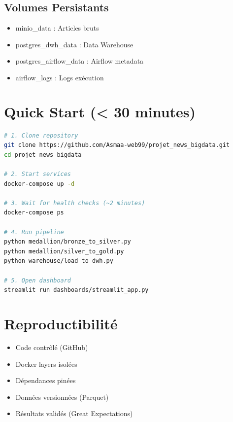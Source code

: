 \documentclass[12pt,a4paper]{report}
\begin{document}
\subsection{Volumes Persistants}

\begin{itemize}
    \item minio\_data : Articles bruts
    \item postgres\_dwh\_data : Data Warehouse
    \item postgres\_airflow\_data : Airflow metadata
    \item airflow\_logs : Logs exécution
\end{itemize}

\section{Quick Start (< 30 minutes)}

\begin{lstlisting}[language=bash, caption={Démarrage rapide}]
# 1. Clone repository
git clone https://github.com/Asmaa-web99/projet_news_bigdata.git
cd projet_news_bigdata

# 2. Start services
docker-compose up -d

# 3. Wait for health checks (~2 minutes)
docker-compose ps

# 4. Run pipeline
python medallion/bronze_to_silver.py
python medallion/silver_to_gold.py
python warehouse/load_to_dwh.py

# 5. Open dashboard
streamlit run dashboards/streamlit_app.py
\end{lstlisting}

\section{Reproductibilité}

\begin{itemize}
    \item[✓] Code contrôlé (GitHub)
    \item[✓] Docker layers isolées
    \item[✓] Dépendances pinées
    \item[✓] Données versionnées (Parquet)
    \item[✓] Résultats validés (Great Expectations)
\end{itemize}

\end{document}
